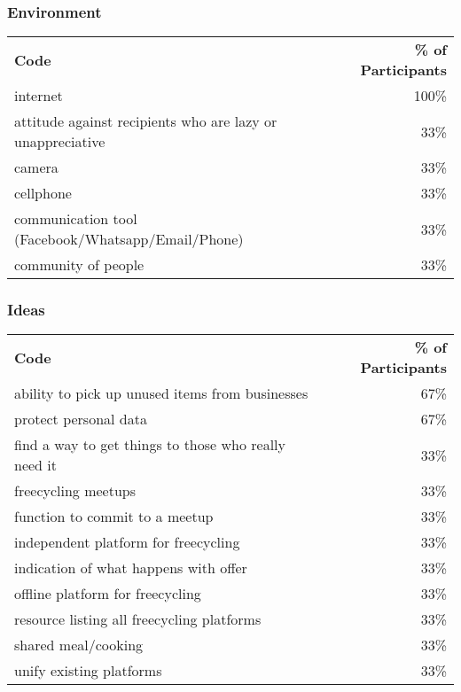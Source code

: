 \subsubsection*{Environment}

\begin{longtable}{p{}r}
\textbf{Code}                                              & \textbf{\% of Participants} \\
internet                                                   & 100\%                       \\
attitude against recipients who are lazy or unappreciative & 33\%                        \\
camera                                                     & 33\%                        \\
cellphone                                                  & 33\%                        \\
communication tool (Facebook/Whatsapp/Email/Phone)         & 33\%                        \\
community of people                                        & 33\%
\end{longtable}

\subsubsection*{Ideas}

\begin{longtable}{p{}r}
\textbf{Code}                                        & \textbf{\% of Participants} \\
ability to pick up unused items from businesses      & 67\%                        \\
protect personal data                                & 67\%                        \\
find a way to get things to those who really need it & 33\%                        \\
freecycling meetups                                  & 33\%                        \\
function to commit to a meetup                       & 33\%                        \\
independent platform for freecycling                 & 33\%                        \\
indication of what happens with offer                & 33\%                        \\
offline platform for freecycling                     & 33\%                        \\
resource listing all freecycling platforms           & 33\%                        \\
shared meal/cooking                                  & 33\%                        \\
unify existing platforms                             & 33\%
\end{longtable}




